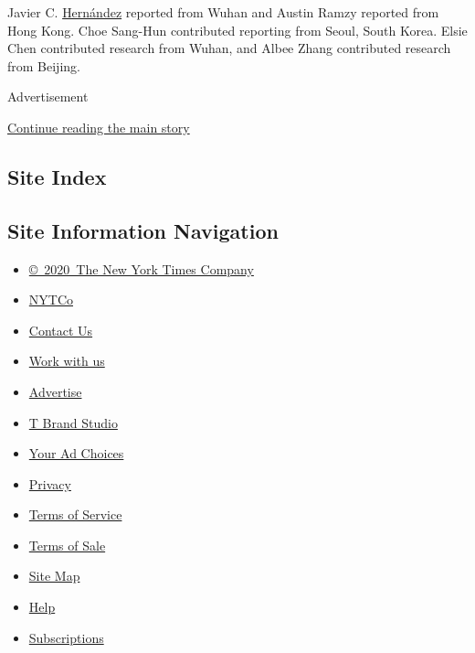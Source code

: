 Javier C.
\href{https://www.nytimes.com/by/javier-c-hernandez}{Hernández} reported
from Wuhan and Austin Ramzy reported from Hong Kong. Choe Sang-Hun
contributed reporting from Seoul, South Korea. Elsie Chen contributed
research from Wuhan, and Albee Zhang contributed research from Beijing.

Advertisement

\protect\hyperlink{after-bottom}{Continue reading the main story}

\hypertarget{site-index}{%
\subsection{Site Index}\label{site-index}}

\hypertarget{site-information-navigation}{%
\subsection{Site Information
Navigation}\label{site-information-navigation}}

\begin{itemize}
\tightlist
\item
  \href{https://help.nytimes.com/hc/en-us/articles/115014792127-Copyright-notice}{©~2020~The
  New York Times Company}
\end{itemize}

\begin{itemize}
\tightlist
\item
  \href{https://www.nytco.com/}{NYTCo}
\item
  \href{https://help.nytimes.com/hc/en-us/articles/115015385887-Contact-Us}{Contact
  Us}
\item
  \href{https://www.nytco.com/careers/}{Work with us}
\item
  \href{https://nytmediakit.com/}{Advertise}
\item
  \href{http://www.tbrandstudio.com/}{T Brand Studio}
\item
  \href{https://www.nytimes.com/privacy/cookie-policy\#how-do-i-manage-trackers}{Your
  Ad Choices}
\item
  \href{https://www.nytimes.com/privacy}{Privacy}
\item
  \href{https://help.nytimes.com/hc/en-us/articles/115014893428-Terms-of-service}{Terms
  of Service}
\item
  \href{https://help.nytimes.com/hc/en-us/articles/115014893968-Terms-of-sale}{Terms
  of Sale}
\item
  \href{https://spiderbites.nytimes.com}{Site Map}
\item
  \href{https://help.nytimes.com/hc/en-us}{Help}
\item
  \href{https://www.nytimes.com/subscription?campaignId=37WXW}{Subscriptions}
\end{itemize}
